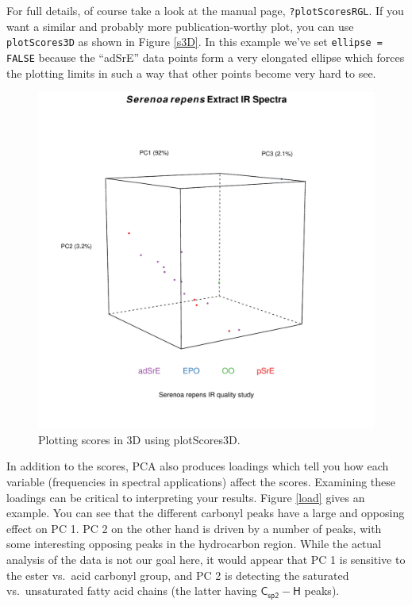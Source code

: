 \documentclass[letter,10pt,twocolumn,twoside,printwatermark=false]{pinp}
\begin{document}
For full details, of course take a look at the manual page,
\texttt{?plotScoresRGL}. If you want a similar and probably more
publication-worthy plot, you can use \texttt{plotScores3D} as shown in
Figure \ref{s3D}. In this example we've set \texttt{ellipse = FALSE}
because the ``adSrE'' data points form a very elongated ellipse which
forces the plotting limits in such a way that other points become very
hard to see.

\begin{Shaded}
\begin{Highlighting}[]
   \NormalTok{)}
\end{Highlighting}
\end{Shaded}

\begin{figure}

{\centering \includegraphics[width=\linewidth,height=\linewidth]{ChemoSpec2_files/figure-latex/Chunk27-1} 

}

\caption{\label{s3D}Plotting scores in 3D using plotScores3D.}\label{fig:Chunk27}
\end{figure}

In addition to the scores, PCA also produces loadings which tell you how
each variable (frequencies in spectral applications) affect the scores.
Examining these loadings can be critical to interpreting your results.
Figure \ref{load} gives an example. You can see that the different
carbonyl peaks have a large and opposing effect on PC 1. PC 2 on the
other hand is driven by a number of peaks, with some interesting
opposing peaks in the hydrocarbon region. While the actual analysis of
the data is not our goal here, it would appear that PC 1 is sensitive to
the ester vs.~acid carbonyl group, and PC 2 is detecting the saturated
vs.~unsaturated fatty acid chains (the latter having
\(\mathsf{C_{sp2}-H}\) peaks).
\end{document}
